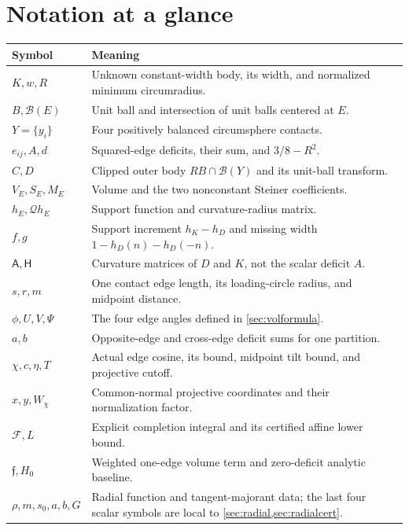 \documentclass[11pt]{article}
\numberwithin{equation}{section}
\theoremstyle{definition}\newtheorem{definition}[theorem]{Definition}
\theoremstyle{remark}\newtheorem{remark}[theorem]{Remark}
\newcommand{\B}{\mathcal B}
\newcommand{\Qh}{\mathcal Q}
\newcommand{\cA}{\mathsf A}
\newcommand{\cH}{\mathsf H}
\begin{document}
\clearpage
\appendix
\section{Notation at a glance}
\begin{longtable}{@{}p{}p{}@{}}
\toprule
Symbol & Meaning\\\midrule\endhead
$K,w,R$ & Unknown constant-width body, its width, and normalized minimum circumradius.\\
$B,\B(E)$ & Unit ball and intersection of unit balls centered at $E$.\\
$Y=\{y_i\}$ & Four positively balanced circumsphere contacts.\\
$e_{ij},A,d$ & Squared-edge deficits, their sum, and $3/8-R^2$.\\
$C,D$ & Clipped outer body $RB\cap\B(Y)$ and its unit-ball transform.\\
$V_E,S_E,M_E$ & Volume and the two nonconstant Steiner coefficients.\\
$h_E,\Qh h_E$ & Support function and curvature-radius matrix.\\
$f,g$ & Support increment $h_K-h_D$ and missing width $1-h_D(n)-h_D(-n)$.\\
$\cA,\cH$ & Curvature matrices of $D$ and $K$, not the scalar deficit $A$.\\
$s,r,m$ & One contact edge length, its loading-circle radius, and midpoint distance.\\
$\phi,U,V,\Psi$ & The four edge angles defined in \cref{sec:volformula}.\\
$a,b$ & Opposite-edge and cross-edge deficit sums for one partition.\\
$\chi,c,\eta,T$ & Actual edge cosine, its bound, midpoint tilt bound, and projective cutoff.\\
$x,y,W_\chi$ & Common-normal projective coordinates and their normalization factor.\\
$\mathcal F,L$ & Explicit completion integral and its certified affine lower bound.\\
$\mathfrak f,H_0$ & Weighted one-edge volume term and zero-deficit analytic baseline.\\
$\rho,m,s_0,a,b,G$ & Radial function and tangent-majorant data; the last four scalar
symbols are local to \cref{sec:radial,sec:radialcert}.\\
\bottomrule
\end{longtable}
\end{document}
